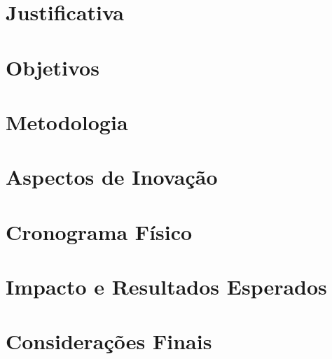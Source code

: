 \documentclass[11pt,oneside,a4paper,english,french,spanish,brazil]{abntex2}
\begin{document}
            \chapter{Justificativa}\label{cap:justificativa}
            

            \chapter{Objetivos}\label{cap:objetivos}
            

            \chapter{Metodologia}\label{cap:metodologia}
            

            \chapter{Aspectos de Inovação}\label{cap:inovacao}
            

            \chapter{Cronograma Físico}\label{cap:cronograma}
            

            \chapter{Impacto e Resultados Esperados}\label{cap:impacto}
            

            \chapter{Considerações Finais}\label{cap:conclusao}
            

          \pagestyle{modalpre}
\end{document}
